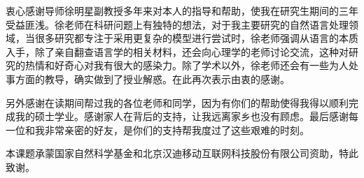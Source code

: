 \begin{acknowledgement}

衷心感谢导师徐明星副教授多年来对本人的指导和帮助，使我在研究生期间的三年受益匪浅。徐老师在科研问题上有独特的想法，对于我主要研究的自然语言处理领域，当很多研究都专注于采用更复杂的模型进行尝试时，徐老师强调从语言的本质入手，除了亲自翻查语言学的相关材料，还会向心理学的老师讨论交流，这种对研究的热情和好奇心对我有很大的感染力。除了学术以外，徐老师还会有一些为人处事方面的教导，确实做到了授业解惑。在此再次表示由衷的感谢。

另外感谢在读期间帮过我的各位老师和同学，因为有你们的帮助使得我得以顺利完成我的硕士学业。感谢家人在背后的支持，让我远离家乡也没有顾虑。最后感谢每一位和我非常亲密的好友，是你们的支持帮我度过了这些艰难的时刻。



本课题承蒙国家自然科学基金和北京汉迪移动互联网科技股份有限公司资助，特此致谢。

\end{acknowledgement}
